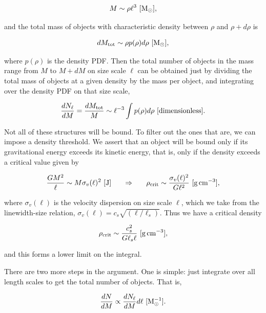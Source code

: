 \documentclass[a4paper,10pt]{article}
\begin{document}
\begin{align*}
    M \sim \rho\ell^3 ~ [{\rm M_\odot}],
\end{align*}

{\noindent}and the total mass of objects with characteristic density between $\rho$
and $\rho+d\rho$ is

\begin{align*}
    dM_\mathrm{tot} \sim \rho p(\rho)d\rho ~ [{\rm M_\odot}],
\end{align*}

{\noindent}where $p(\rho)$ is the density PDF. Then the total number of objects in the mass range from $M$ to $M+dM$ on size scale $\ell$ can be obtained just by dividing the total mass of objects at a given density by the mass per object, and integrating over the density PDF on that size scale,

\begin{align*}
    \frac{dN_\ell}{dM} = \frac{dM_\mathrm{tot}}{M} \sim \ell^{-3} \int p(\rho)d\rho ~ [{\rm dimensionless}].
\end{align*}

{\noindent}Not all of these structures will be bound. To filter out the ones that are, we can impose a density threshold. We assert that an object will be bound only if its gravitational energy exceeds its kinetic energy, that is, only if the density exceeds a critical value given by

\begin{align*}
    \frac{GM^2}{\ell} \sim M\sigma_v(\ell)^2 ~ [{\rm J}] ~~~~~ \Rightarrow ~~~~~ \rho_\mathrm{crit} \sim \frac{\sigma_v(\ell)^2}{G\ell^2} ~ [{\rm g\,cm^{-3}}],
\end{align*}

{\noindent}where $\sigma_v(\ell)$ is the velocity dispersion on size scale $\ell$, which we take from the linewidth-size relation, $\sigma_v(\ell) = c_s\sqrt{(\ell/\ell_s)}$. Thus we have a critical density

\begin{align*}
    \rho_\mathrm{crit} \sim \frac{c_s^2}{G\ell_s\ell} ~ [{\rm g\,cm^{-3}}],
\end{align*}

{\noindent}and this forms a lower limit on the integral.

{\noindent}There are two more steps in the argument. One is simple: just integrate over all length scales to get the total number of objects. That is, 

\begin{align*}
    \frac{dN}{dM} \propto \frac{dN_\ell}{dM}d\ell ~ [{\rm M_\odot^{-1}}]. 
\end{align*}
\end{document}
